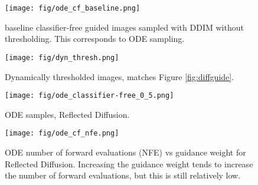 \documentclass{article}
\theoremstyle{plain}
\theoremstyle{definition}
\theoremstyle{remark}
\begin{document}
\begin{figure}[H]
    \centering
    \texttt{[image: fig/ode\_cf\_baseline.png]}
    \caption{ baseline classifier-free guided images sampled with DDIM without thresholding. This corresponds to ODE sampling.}
    \label{fig:app:ode_cf_baseline}
\end{figure}

\begin{figure}[H]
    \centering
    \texttt{[image: fig/dyn\_thresh.png]}
    \caption{Dynamically thresholded images, matches Figure \ref{fig:diffguide}.}
\end{figure}

\begin{figure}[H]
    \centering
    \texttt{[image: fig/ode\_classifier-free\_0\_5.png]}
    \caption{ ODE samples, Reflected Diffusion.}
    \label{fig:app:0.5ode}
\end{figure}

\begin{figure}[H]
    \centering
    \texttt{[image: fig/ode\_cf\_nfe.png]}
    \caption{ODE number of forward evaluations (NFE) vs guidance weight for Reflected Diffusion. Increasing the guidance weight tends to increase the number of forward evaluations, but this is still relatively low.}
    \label{fig:app:ode_nfe}
\end{figure} 
\end{document}
